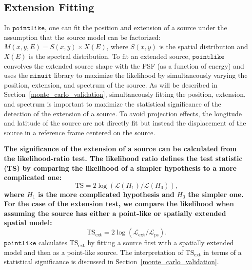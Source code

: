 \documentclass[12pt,preprint]{aastex}
\newcommand{\tsext}{{\ensuremath{\text{TS}_{\text{ext}}}}\xspace}
\newcommand{\likelihood}{\ensuremath{\mathcal{L}}\xspace}
\newcommand{\ts}{\text{TS}\xspace}
\newcommand{\pointlike}{\ensuremath{\mathtt{pointlike}}\xspace}
\newcommand{\minuit}{\ensuremath{\mathtt{minuit}}\xspace}
\newcommand{\newtext}[1]{{\bfseries \color{red}#1}}
\begin{document}
\subsection{Extension Fitting}
\label{extension_fitting}

In \pointlike, one can fit the position and extension 
of a source under the assumption that the source model
can be factorized:
$M(x,y,E)=S(x,y)\times X(E)$, where $S(x,y)$ is the spatial distribution
and $X(E)$ is the spectral distribution.  To fit an extended source,
\pointlike convolves the extended source shape with the PSF (as a function
of energy) and uses the \minuit library \citep{minuit_documentation}
to maximize the likelihood by simultaneously varying the position,
extension, and spectrum of the source.  As will be described in
Section~\ref{monte_carlo_validation}, simultaneously fitting the
position, extension, and spectrum is important to maximize
the statistical significance of the detection of the extension of a source.
To avoid projection effects, the longitude and latitude 
of the source are
not directly fit but instead the displacement of the source 
in a reference frame centered on the source.

\newtext{
The significance of the extension of a source can be calculated from the
likelihood-ratio test. The likelihood ratio defines the
test statistic (TS) by comparing the likelihood of a simpler hypothesis to
a more complicated one:
\begin{equation}
  \ts=2\log(\likelihood(H_1)/\likelihood(H_0)),
\end{equation}
where $H_1$ is the more complicated hypothesis and $H_0$ the simpler one.
For the case of the extension test, we compare the likelihood
when assuming the source has either a point-like or spatially extended spatial model:}
\begin{equation}
  \tsext=2\log(\likelihood_\text{ext}/\likelihood_\text{ps}).
\end{equation}
\pointlike calculates \tsext by fitting a source first with a spatially
extended model and then as a point-like source.  The interpretation
of \tsext in terms of a statistical significance is discussed in
Section~\ref{monte_carlo_validation}.
\end{document}
